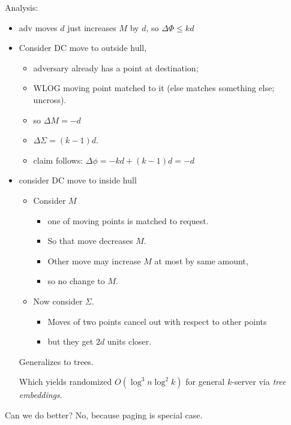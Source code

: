 \documentclass{article}
\begin{document}
Analysis:
\begin{itemize}
\item adv moves $d$ just increases $M$ by $d$, so $\Delta \Phi \le kd$
\item Consider DC move to outside hull, 
\begin{itemize}
\item  adversary already has a point at destination;
\item  WLOG moving point matched to it (else matches something else;
  uncross).
\item so $\Delta M=-d$
\item $\Delta \Sigma = (k-1)d$. 
\item claim follows: $\Delta \phi = -kd+(k-1)d = -d$
\end{itemize}
\item consider DC move to inside hull
\begin{itemize}
\item Consider $M$
\begin{itemize}
\item one of moving points is matched to request.  
\item So
  that move decreases $M$.  
\item Other move may increase $M$ at most by same amount,
\item  so no change to $M$.
\end{itemize}
\item Now consider $\Sigma$.  
\begin{itemize}
\item Moves of two points cancel out with
  respect to other points
\item  but they get $2d$ units closer.
\end{itemize}
\end{itemize}

Generalizes to trees.

Which yields randomized $O(\log^3 n \log^2 k)$ for general $k$-server via \emph{tree embeddings}.


\end{itemize}

Can we do better?  No, because paging is special case.


\end{document}
